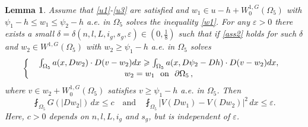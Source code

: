 \documentclass[10pt,a4paper]{article}
\newtheorem{lemma}[theorem]{Lemma}
\theoremstyle{definition}
\numberwithin{equation}{section}
\begin{document}
\begin{lemma}\label{w1w2l}
	Assume that \eqref{u1}-\eqref{u3} are satisfied and   $w_1 \in u-h+ W_0^{1,G}(\Omega_5)$ with $\psi_1-h\leqslant w_1\leqslant \psi_2-h $ a.e. in $\Omega_5$ solves the inequality \eqref{w1}.  
	For any $\varepsilon > 0$ there exists a small $\delta=\delta(n,l,L,i_g,s_g,\varepsilon) \in (0,\frac{1}{8})$ such that if \eqref{ass2} holds for such $\delta$ and  $w_2 \in W^{1,G}(\Omega_5)$ with $ w_2 \geqslant \psi_1-h$ a.e. in $\Omega_5$ solves
	\begin{equation}\label{w2}
		\left\{\begin{array}{r@{\ \ }c@{\ \ }ll}
			&\int_{\Omega_5}  a(x,  Dw_2) \cdot D(v-w_2)dx \geqslant \int_{\Omega_5}  a(x,  D\psi_2-Dh) \cdot D(v-w_2)dx,  \\[0.05cm]
			&w_2=w_1 \ \ \mbox{on}\ \ \partial \Omega_5 \,,
		\end{array}\right.
	\end{equation}
	where $v\in w_2+W_0^{1,G}(\Omega_5)$ satisfies $ v \geqslant \psi_1-h$ a.e. in $\Omega_5$.
	Then
	\begin{equation}\label{w1w2}
		\fint_{\Omega_5} G(|Dw_2|)\,dx \leq c \quad \text{and} \quad \fint_{\Omega_5} |V(Dw_1)-V(Dw_2)|^2\,dx \leq \varepsilon.  
	\end{equation}
	Here, $c > 0$ depends on $n,l,L,i_g$ and $s_g$, but is independent of $\varepsilon$.
	\end{lemma}
	
\end{document}
